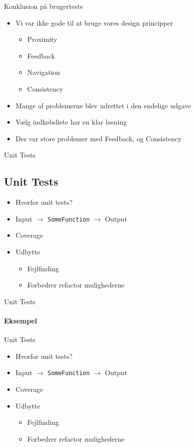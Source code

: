 \begin{frame}{Konklusion på brugertests}	
	
\begin{itemize}
	\item Vi var ikke gode til at bruge vores design principper
		\begin{itemize}
			\item Proximity
			\item Feedback
			\item Navigation
			\item Consistency
		\end{itemize}
	\item Mange af problemerne blev udrettet i den endelige udgave
	\item Vælg indkøbsliste har en klar løsning
	\item Der var store problemer med Feedback, og Consistency
\end{itemize}
  
\end{frame}


\begin{frame}{Unit Tests}
\subsection{Unit Tests}

\begin{itemize}
	\item Hvorfor unit tests?
	\item Input $\rightarrow$ \texttt{SomeFunction} $\rightarrow$  Output
	\item Coverage
	\item Udbytte
	\begin{itemize}
		\item Fejlfinding
		\item Forbedrer refactor mulighederne
	\end{itemize}
\end{itemize}

\end{frame}
\begin{frame}{Unit Tests}
\framesubtitle{Eksempel}
\hbox{\hspace{5 mm}\scalebox{0.8}{
	  }} 

\end{frame}

\begin{frame}{Unit Tests}

\begin{itemize}
	\item Hvorfor unit tests?
	\item Input $\rightarrow$ \texttt{SomeFunction} $\rightarrow$  Output
	\item Coverage
	\item Udbytte
	\begin{itemize}
		\item Fejlfinding
		\item Forbedrer refactor mulighederne
	\end{itemize}
\end{itemize}

\end{frame}
